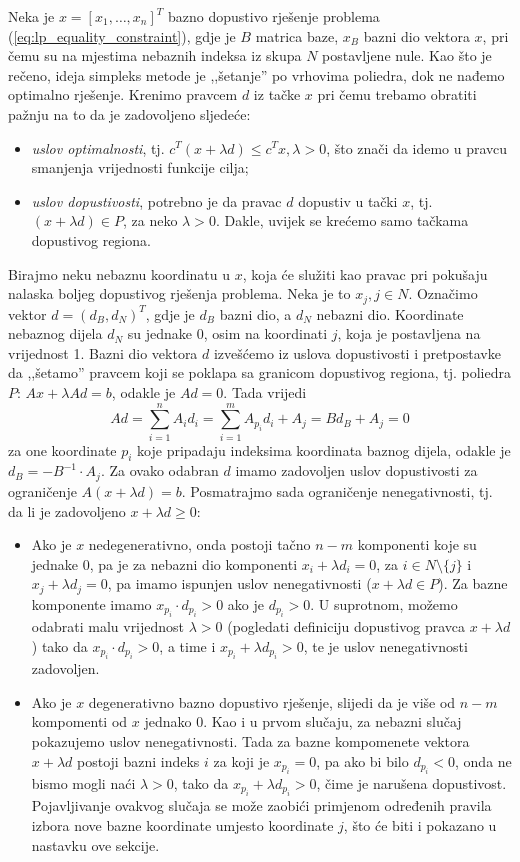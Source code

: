 \documentclass[b5paper, utf8, 11pt, colorlinks]{book}
\theoremstyle{definition}
\begin{document}
Neka je $x = [x_1,\ldots, x_n]^T$ bazno dopustivo rješenje problema (\ref{eq:lp_equality_constraint}), gdje je $B$ matrica baze, $x_B$ bazni dio vektora $x$, pri čemu su na mjestima nebaznih indeksa iz skupa $N$ postavljene nule.  Kao što je rečeno, ideja simpleks metode je  ,,šetanje'' po vrhovima poliedra,  dok ne nađemo optimalno rješenje. Krenimo pravcem $d$  iz tačke $x$  pri čemu trebamo obratiti  pažnju na to da je zadovoljeno sljedeće:
\begin{itemize}
	\item \emph{uslov optimalnosti}, tj. $c^T (x + \lambda d) \leq c^T x, \lambda>0$, što znači da idemo u pravcu smanjenja vrijednosti funkcije cilja;
	\item \emph{uslov dopustivosti}, potrebno je da pravac $d$ dopustiv u tački $x$, tj. $ (x + \lambda d) \in P$, za neko $\lambda>0$. Dakle, uvijek se krećemo samo tačkama dopustivog regiona. 
\end{itemize}
Birajmo neku nebaznu koordinatu u $x$, koja će služiti kao pravac pri pokušaju nalaska boljeg dopustivog rješenja problema. 
Neka je to $x_j, j \in N$. Označimo vektor $d=(d_B,  d_N)^T$, gdje je $d_B$ bazni dio, a $d_N$ nebazni dio.  Koordinate nebaznog dijela $d_N$ su jednake 0, osim na koordinati $j$, koja je postavljena na vrijednost 1.   Bazni dio vektora $d$ izvešćemo iz uslova dopustivosti i pretpostavke da ,,šetamo'' pravcem koji se poklapa sa granicom dopustivog regiona, tj. poliedra $P$: $Ax + \lambda Ad = b$, odakle je $Ad = 0$. Tada vrijedi
$$ Ad = \sum_{i=1}^n A_i d_i = \sum_{i=1}^m A_{p_i} d_i + A_j = B d_B + A_j = 0$$ za one koordinate $p_i$ koje pripadaju indeksima koordinata baznog dijela, 
odakle je $d_B = -  B^{-1} \cdot A_j $.  Za ovako odabran $d$ imamo zadovoljen uslov dopustivosti za ograničenje $A( x + \lambda d )  =b$. Posmatrajmo sada ograničenje nenegativnosti, tj. da li je zadovoljeno $x + \lambda d \geq 0$:
\begin{itemize}
	\item Ako je $x$ nedegenerativno, onda postoji tačno $n-m$ komponenti koje su jednake 0, pa je za nebazni dio komponenti $x_i + \lambda d_i = 0$, za $i \in N \setminus \{j\}$ i $x_j + \lambda d_j = 0$, pa imamo ispunjen uslov nenegativnosti ($x + \lambda d\in P$). Za bazne komponente imamo $x_{p_i} \cdot d_{p_i} > 0 $ ako je $d_{p_i}>0$. U suprotnom, možemo odabrati  malu vrijednost  $\lambda>0$ (pogledati definiciju dopustivog pravca $x +\lambda d$) tako da $x_{p_i} \cdot d_{p_i} >0$, a time i $x_{p_i} + \lambda d_{p_i}>0$, te je uslov nenegativnosti zadovoljen.
	
	\item Ako je $x$ degenerativno bazno dopustivo rješenje, slijedi da je više od $n-m$ kompomenti od $x$ jednako 0. Kao i u prvom slučaju, za nebazni slučaj pokazujemo uslov nenegativnosti. Tada za bazne kompomenete vektora $x +\lambda d$  postoji bazni indeks $i$ za koji je $x_{p_i} = 0$, pa ako bi bilo $d_{p_i}< 0$, onda ne bismo mogli naći $\lambda>0$, tako da $x_{p_i} + \lambda d_{p_i} >0$, čime je narušena dopustivost. Pojavljivanje ovakvog slučaja se može zaobići primjenom određenih pravila izbora nove bazne koordinate umjesto koordinate $j$, što će biti i pokazano u nastavku ove sekcije. 
\end{itemize}
\end{document}

